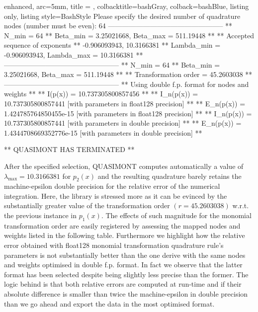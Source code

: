 \documentclass[a4paper, twosided]{book}
\begin{document}
\vspace{0.2cm}
\begin{tcblisting}{enhanced,
                   arc=5mm,
                   title = \color{black}{\large \ttfamily Building and executing the test driver: p\_2(x)},
                   colbacktitle=bashGray,
                   colback=bashBlue,
                   listing only,
                   listing style=BashStyle}
Please specify the desired number of quadrature nodes (number must be even): 64
 --------------------------------------------------
 ** N_min = 64
 ** Beta_min = 3.25021668, Beta_max = 511.19448 **
 ** Accepted sequence of exponents ** 
    {-0.906093943, 10.3166381}
 ** Lambda_min = -0.906093943, Lambda_max = 10.3166381 **
 --------------------------------------------------
 ** N_min = 64
 ** Beta_min = 3.25021668, Beta_max = 511.19448 **
 ** Transformation order = 45.2603038 **
 --------------------------------------------------
 ** Using double f.p. format for nodes and weights **
 ** I(p(x))   = 10.737305800857456 **
 ** I_n(p(x)) = 10.737305800857441     [with parameters in float128 precision] **
 ** E_n(p(x)) = 1.424785764850455e-15  [with parameters in float128 precision] **
 ** I_n(p(x)) = 10.737305800857441     [with parameters in double precision] **
 ** E_n(p(x)) = 1.4344708669352776e-15 [with parameters in double precision] **

 ** QUASIMONT HAS TERMINATED **
\end{tcblisting}

\noindent
After the specified selection, QUASIMONT computes automatically a value of $\lambda_{\text{max}} = 10.3166381$ for $p_2(x)$ and the resulting quadrature barely retains the machine-epsilon double precision for the relative error of the numerical integration. Here, the library is stressed more as it can be evinced by the substantially greater value of the transformation order $(r=45.2603038)$ w.r.t. the previous instance in $p_1(x)$. The effects of such magnitude for the monomial transformation order are easily registered by assessing the mapped nodes and weights listed in the following table. Furthermore we highlight how the relative error obtained with \colorbox{poliGrayBlue}{float128} monomial transformation quadrature rule's parameters is not substantially better than the one derive with the same nodes and weights optimised in double f.p. format. In fact we observe that the latter format has been selected despite being slightly less precise than the former. The logic behind is that both relative errors are computed at run-time and if their absolute difference is smaller than twice the machine-epsilon in double precision than we go ahead and export the data in the most optimised format.
\end{document}
